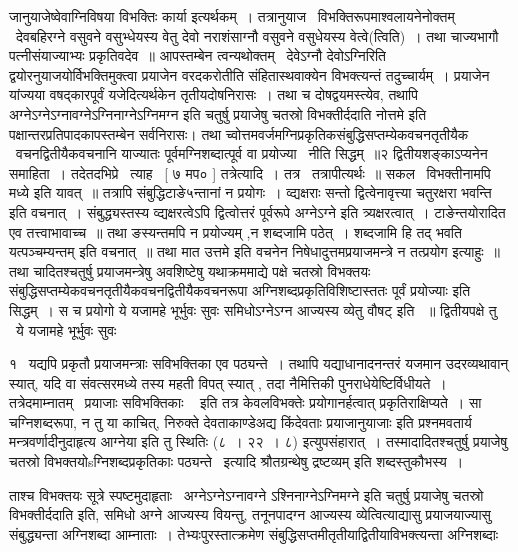 \documentclass[11pt, openany]{book}
\begin{document}
जानुयाजेष्वेवाग्निविषया विभक्तिः कार्या इत्यर्थकम्~। तत्रानुयाज \textendash\ 
विभक्तिरूपमाश्वलायनेनोक्तम् \textendash\ देवबहिरग्ने वसुवने वसुभ्धेयस्य वेतु देवो
नराशंसाग्नौ वसुवने वसुधेयस्य वेत्वे(त्विति)~। तथा चाज्यभागौ
पत्नीसंयाज्याभ्यः प्रकृतिवदेव~॥ आपस्तम्बेन त्वन्यथोक्तम् \textendash\ देवेऽग्नौ
देवोऽग्निरिति द्वयोरनुयाजयोर्विभक्तिमुक्त्वा प्रयाजेन वरदकरोतीति
संहितास्थवाक्येन विभक्त्यन्तं तदुच्चार्यम्~। प्रयाजेन यांज्यया
वषद्कारपूर्वं यजेदित्यर्थकेन तृतीयदोषनिरासः~। तथा च दोषद्वयमस्त्येव,
तथापि अग्नेऽग्नेऽग्नावग्नेऽग्निनाग्नेऽग्निमग्न इति चतुर्षु
प्रयाजेषु चतस्रो विभक्तीर्ददाति नोत्तमे इति
पक्षान्तरप्रतिपादकापस्तम्बेन सर्वनिरासः। तथा
च्वोत्तमवर्जमग्निप्रकृतिकसंबुद्धिसप्तम्येकवचनतृतीयैक \textendash\ वचनद्वितीयैकवचनानि
याज्यातः पूर्वमग्निशब्दात्पूर्व वा प्रयोज्या \textendash\ नीति सिद्धम्~॥२
द्वितीयशङ्काऽप्यनेन समाहिता~। तदेतदभिप्रे \textendash\ त्याह \textendash\ [ ७ मप० ]
तत्रेत्यादि~। तत्र \textendash\ तत्रापीत्यर्थः~॥ सकल \textendash\ विभक्तीनामपि मध्ये इति
यावत्~॥ तत्रापि संबुद्धिटाङे५न्तानां न प्रयोगः~। {\qt व्द्यक्षराः सन्तो
द्वित्वेनावृत्त्या चतुरक्षरा भवन्ति} इति वचनात्~। संबुद्ध्यस्तस्य
व्द्यक्षरत्वेऽपि द्वित्वोत्तरं पूर्वरूपे अग्नेऽग्ने इति
त्र्यक्षरत्वात्~। टाङेन्तयोरादित एव तत्त्वाभावाच्च~॥ तथा ङस्यन्तमपि न
प्रयोज्यम् ,{\qt  न शब्दजामि पठेत्~। शब्दजामि हि तद् भवति
यत्पञ्चम्यन्तम्} इति वचनात्~॥ तथा {\qt मात उत्तमे} इति वचनेन
निषेधादुत्तमप्रयाजमन्त्रे न तत्प्रयोग इत्याहुः~॥ तथा चादितश्चतुर्षु
प्रयाजमन्त्रेषु अवशिष्टेषु यथाक्रममाद्ये पक्षे चतस्रो विभक्तयः
संबुद्धिसप्तम्येकवचनतृतीयैकवचनद्वितीयैकवचनरूपा
अग्निशब्दप्रकृतिविशिष्टास्ततः पूर्वं प्रयोज्याः इति सिद्धम्~। स च
प्रयोगो ये यजामहे भूर्भुवः सुवः समिधोऽग्नेऽग्न आज्यस्य व्येतु वौषट् इति
~॥ द्वितीयपक्षे तु \textendash\ ये यजामहे भूर्भुवः सुवः 



१ \textendash\ यद्यपि प्रकृतौ प्रयाजमन्त्राः सविभक्तिका एव पठ्यन्ते~। तथापि
यद्याधानादनन्तरं यजमान उदरव्यथावान् स्यात्, यदि वा संवत्सरमध्ये तस्य
महती विपत् स्यात् , तदा नैमित्तिकी पुनराधेयेष्टिर्विधीयते~। 
तत्रेदमाम्नातम् \textendash\ {\qt प्रयाजाः सविभक्तिकाः \textendash\ } इति तत्र केवलविभक्तेः
प्रयोगानर्हत्वात् प्रकृतिराक्षिप्यते~। सा चग्निशब्दरूपा, न तु या काचित्,
निरुक्ते देवताकाण्डे{\qt अद्य किंदेवताः प्रयाजानुयाजाः} इति प्रश्नमवतार्य
मन्त्रवर्णादीनुदाहृत्य {\qt आग्नेया इति तु स्थितिः} (८~। २२~। ८)
इत्युपसंहारात्~। तस्मादादितश्चतुर्षु प्रयाजेषु चतस्रो
विभक्तयोsग्निशब्दप्रकृतिकाः पठ्यन्ते \textendash\ इत्यादि श्रौतग्रन्थेषु
द्रष्टव्यम् इति शब्दस्तुकौभस्य~। 

 {\qt ताश्च विभक्तयः} सूत्रे स्पष्टमुदाहृताः \textendash\ {\qt अग्नेऽग्नेऽग्नावग्ने
ऽश्निनाग्नेऽग्निमग्ने} इति चतुर्षु प्रयाजेषु चतस्रो विभक्तीर्ददाति
इति, समिधो अग्ने आज्यस्य वियन्तु, तनूनपादग्न आज्यस्य
व्येत्वित्याद्यासु प्रयाजयाज्यासु संबुद्ध्यन्ता अग्निशब्दा आम्नाताः~। 
तेभ्यःपुरस्तात्क्रमेण संबुद्धिसप्तमीतृतीयाद्वितीयाविभक्त्यन्ता
अग्निशब्दाः
\end{document}
